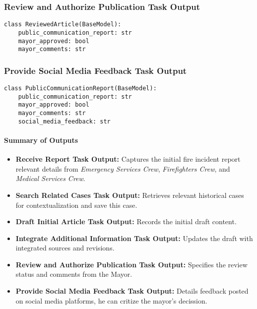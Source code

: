 \subsubsection{Review and Authorize Publication Task Output}
\begin{lstlisting}[caption={Pydantic model for Review and Authorize Publication Task Output}]
class ReviewedArticle(BaseModel):
    public_communication_report: str
    mayor_approved: bool
    mayor_comments: str
\end{lstlisting}

\subsubsection{Provide Social Media Feedback Task Output}
\begin{lstlisting}[caption={Pydantic model for Provide Social Media Feedback Task Output}]
class PublicCommunicationReport(BaseModel):
    public_communication_report: str
    mayor_approved: bool
    mayor_comments: str
    social_media_feedback: str
\end{lstlisting}

\paragraph{Summary of Outputs}
\begin{itemize}
    \item \textbf{Receive Report Task Output:} Captures the initial fire incident report relevant details from \textit{Emergency Services Crew}, \textit{Firefighters Crew}, and \textit{Medical Services Crew}.
    \item \textbf{Search Related Cases Task Output:} Retrieves relevant historical cases for contextualization and save this case.
    \item \textbf{Draft Initial Article Task Output:} Records the initial draft content.
    \item \textbf{Integrate Additional Information Task Output:} Updates the draft with integrated sources and revisions.
    \item \textbf{Review and Authorize Publication Task Output:} Specifies the review status and comments from the Mayor.
    \item \textbf{Provide Social Media Feedback Task Output:} Details feedback posted on social media platforms, he can critize the mayor's decission.
\end{itemize}
